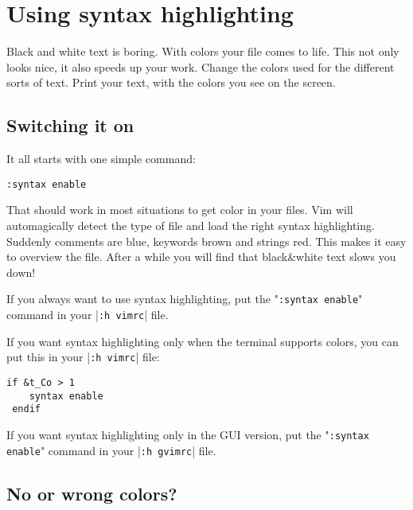 \section{Using syntax highlighting}
\label{Using syntax highlighting}
Black and white text is boring.  With colors your file comes to life.  This
not only looks nice, it also speeds up your work.  Change the colors used for
the different sorts of text.  Print your text, with the colors you see on the
screen.
\subsection{Switching it on}

It all starts with one simple command:

 \begin{Verbatim}[samepage=true]
 :syntax enable
 \end{Verbatim}

That should work in most situations to get color in your files.
Vim will automagically detect the type of file and load the right syntax highlighting.
Suddenly comments are blue, keywords brown and strings red.
This makes it easy to overview the file.
After a while you will find that black\&white text slows you down!

If you always want to use syntax highlighting, put the "\verb!:syntax enable!" command in your |\verb!:h vimrc!| file.

If you want syntax highlighting only when the terminal supports colors, you can put this in your |\verb!:h vimrc!| file:

 \begin{Verbatim}[samepage=true]
 if &t_Co > 1
    syntax enable
 endif
 \end{Verbatim}

If you want syntax highlighting only in the GUI version, put the "\verb!:syntax enable!" command in your |\verb!:h gvimrc!| file.

\subsection{No or wrong colors?}
\label{No or wrong colors?}


